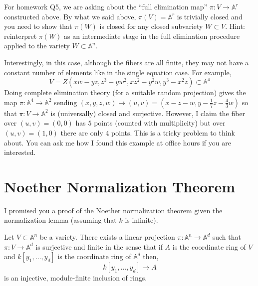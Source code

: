 \documentclass[12pt]{article}
\newcommand{\A}{\mathbb{A}}
\begin{document}
\begin{rmk}
For homework Q5, we are asking about the ``full elimination map'' $\pi : V \to \A^r$ constructed above. By what we said above, $\pi(V) = \A^r$ is trivially closed and you need to show that $\pi(W)$ is closed for any closed subvariety $W \subset V$. Hint: reinterpret $\pi(W)$ as an intermediate stage in the full elimination procedure applied to the variety $W \subset \A^n$.
\end{rmk}

\begin{rmk}
Interestingly, in this case, although the fibers are all finite, they may not have a constant number of elements like in the single equation case. For example, 
\[ V = Z(xw - yz, z^3 - yw^2, x z^2 - y^2 w, y^3 - x^2 z) \subset \A^4 \]
Doing complete elimination theory (for a suitable random projection) gives the map $\pi : \A^4 \to \A^2$ sending $(x,y,z,w) \mapsto (u,v) = (x - z - w, y - \tfrac{1}{7} z - \tfrac{4}{3} w)$ so that $\pi : V \to \A^2$ is (universally) closed and surjective. However, I claim the fiber over $(u,v) = (0,0)$ has $5$ points (counted with multiplicity) but over $(u,v) = (1,0)$ there are only $4$ points. This is a tricky problem to think about. You can ask me how I found this example at office hours if you are interested.
\end{rmk}

\section{Noether Normalization Theorem}

I promised you a proof of the Noether normalization theorem given the normalization lemma (assuming that $k$ is infinite).

\begin{theorem}[Noether]
Let $V \subset \A^n$ be a variety. There exists a linear projection $\pi : \A^n \to \A^d$ such that $\pi : V \to \A^d$ is surjective and finite in the sense that if $A$ is the coordinate ring of $V$ and $k[y_1, \dots, y_d]$ is the coordinate ring of $\A^d$ then,
\[ k[y_1, \dots, y_d] \to A \]
is an injective, module-finite inclusion of rings.
\end{theorem}
\end{document}
